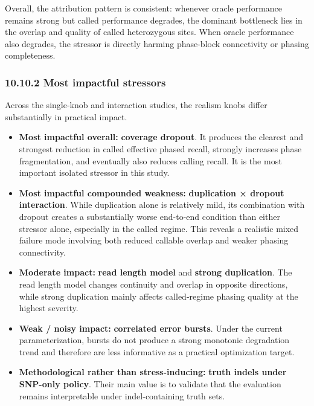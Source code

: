 \documentclass[
]{article}
\begin{document}
Overall, the attribution pattern is consistent: whenever oracle
performance remains strong but called performance degrades, the dominant
bottleneck lies in the overlap and quality of called heterozygous sites.
When oracle performance also degrades, the stressor is directly harming
phase-block connectivity or phasing completeness.

\subsubsection{10.10.2 Most impactful
stressors}\label{most-impactful-stressors}

Across the single-knob and interaction studies, the realism knobs differ
substantially in practical impact.

\begin{itemize}
\item
  \textbf{Most impactful overall:} \textbf{coverage dropout}. It
  produces the clearest and strongest reduction in called effective
  phased recall, strongly increases phase fragmentation, and eventually
  also reduces calling recall. It is the most important isolated
  stressor in this study.
\item
  \textbf{Most impactful compounded weakness:} \textbf{duplication ×
  dropout interaction}. While duplication alone is relatively mild, its
  combination with dropout creates a substantially worse end-to-end
  condition than either stressor alone, especially in the called regime.
  This reveals a realistic mixed failure mode involving both reduced
  callable overlap and weaker phasing connectivity.
\item
  \textbf{Moderate impact:} \textbf{read length model} and
  \textbf{strong duplication}. The read length model changes continuity
  and overlap in opposite directions, while strong duplication mainly
  affects called-regime phasing quality at the highest severity.
\item
  \textbf{Weak / noisy impact:} \textbf{correlated error bursts}. Under
  the current parameterization, bursts do not produce a strong monotonic
  degradation trend and therefore are less informative as a practical
  optimization target.
\item
  \textbf{Methodological rather than stress-inducing:} \textbf{truth
  indels under SNP-only policy}. Their main value is to validate that
  the evaluation remains interpretable under indel-containing truth
  sets.
\end{itemize}
\end{document}
